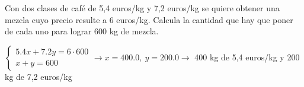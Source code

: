 \documentclass[addpoints,spanish, 12pt,a4paper]{exam}
\begin{document}
\begin{questions}


\question[1] Con dos clases de café de 5,4 euros/kg y 7,2 euros/kg se quiere obtener una mezcla cuyo precio resulte a 6 euros/kg. Calcula la cantidad que hay que poner de cada uno para lograr 600 kg de mezcla.

\begin{solution} $\left\{\begin{matrix}5.4x+7.2y=6 \cdot 600 \\ x+y=600\end{matrix}\right. \to  x = 400.0, \  y = 200.0 \to$ 400 kg de 5,4 euros/kg y 200 kg de 7,2 euros/kg \end{solution}




\end{questions}
\end{document}
